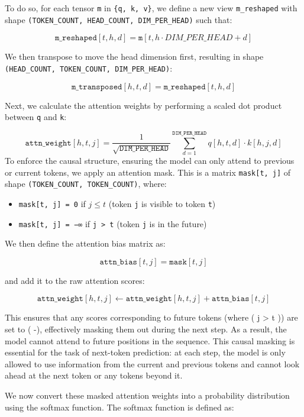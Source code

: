 \documentclass[11pt]{article}
\providecommand{\tightlist}{%
      \setlength{\itemsep}{0pt}\setlength{\parskip}{0pt}}
\begin{document}
To do so, for each tensor \texttt{m} in \texttt{\{q,\ k,\ v\}}, we
define a new view \texttt{m\_reshaped} with shape
\texttt{(TOKEN\_COUNT,\ HEAD\_COUNT,\ DIM\_PER\_HEAD)} such that:

\[
\texttt{m\_reshaped}[t, h, d] = \texttt{m}[t, h \cdot DIM\_PER\_HEAD + d]
\]

We then transpose to move the head dimension first, resulting in shape
\texttt{(HEAD\_COUNT,\ TOKEN\_COUNT,\ DIM\_PER\_HEAD)}:

\[
\texttt{m\_transposed}[h, t, d] = \texttt{m\_reshaped}[t, h, d]
\]

Next, we calculate the attention weights by performing a scaled dot
product between \texttt{q} and \texttt{k}:

\[
\texttt{attn\_weight}[h, t, j] = \frac{1}{\sqrt{\texttt{DIM\_PER\_HEAD}}} \sum_{d=1}^{\texttt{DIM\_PER\_HEAD}} q[h, t, d] \cdot k[h, j, d]
\] To enforce the causal structure, ensuring the model can only attend
to previous or current tokens, we apply an attention mask. This is a
matrix \texttt{mask{[}t,\ j{]}} of shape
\texttt{(TOKEN\_COUNT,\ TOKEN\_COUNT)}, where:

\begin{itemize}
\tightlist
\item
  \texttt{mask[t, j] = 0} if \texttt{\( j \leq t \)} (token \texttt{j} is visible to token \texttt{t})
\item
  \texttt{mask{[}t,\ j{]}\ =\ −∞} if \texttt{j\ \textgreater{}\ t}
  (token \texttt{j} is in the future)
\end{itemize}

We then define the attention bias matrix as:

\[
\texttt{attn\_bias}[t, j] = \texttt{mask}[t, j]
\]

and add it to the raw attention scores:

\[
\texttt{attn\_weight}[h, t, j] \leftarrow \texttt{attn\_weight}[h, t, j] + \texttt{attn\_bias}[t, j]
\]

This ensures that any scores corresponding to future tokens (where ( j
\textgreater{} t )) are set to ( -\infty ), effectively masking them out
during the next step. As a result, the model cannot attend to future
positions in the sequence. This causal masking is essential for the task
of next-token prediction: at each step, the model is only allowed to use
information from the current and previous tokens and cannot look ahead
at the next token or any tokens beyond it.

We now convert these masked attention weights into a probability
distribution using the softmax function. The softmax function is defined
as:
\end{document}

